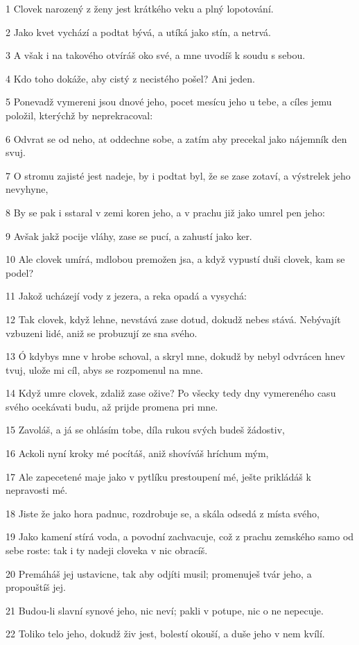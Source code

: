\par 1 Clovek narozený z ženy jest krátkého veku a plný lopotování.
\par 2 Jako kvet vychází a podtat bývá, a utíká jako stín, a netrvá.
\par 3 A však i na takového otvíráš oko své, a mne uvodíš k soudu s sebou.
\par 4 Kdo toho dokáže, aby cistý z necistého pošel? Ani jeden.
\par 5 Ponevadž vymereni jsou dnové jeho, pocet mesícu jeho u tebe, a cíles jemu položil, kterýchž by neprekracoval:
\par 6 Odvrat se od neho, at oddechne sobe, a zatím aby precekal jako nájemník den svuj.
\par 7 O stromu zajisté jest nadeje, by i podtat byl, že se zase zotaví, a výstrelek jeho nevyhyne,
\par 8 By se pak i sstaral v zemi koren jeho, a v prachu již jako umrel pen jeho:
\par 9 Avšak jakž pocije vláhy, zase se pucí, a zahustí jako ker.
\par 10 Ale clovek umírá, mdlobou premožen jsa, a když vypustí duši clovek, kam se podel?
\par 11 Jakož ucházejí vody z jezera, a reka opadá a vysychá:
\par 12 Tak clovek, když lehne, nevstává zase dotud, dokudž nebes stává. Nebývajít vzbuzeni lidé, aniž se probuzují ze sna svého.
\par 13 Ó kdybys mne v hrobe schoval, a skryl mne, dokudž by nebyl odvrácen hnev tvuj, ulože mi cíl, abys se rozpomenul na mne.
\par 14 Když umre clovek, zdaliž zase ožive? Po všecky tedy dny vymereného casu svého ocekávati budu, až prijde promena pri mne.
\par 15 Zavoláš, a já se ohlásím tobe, díla rukou svých budeš žádostiv,
\par 16 Ackoli nyní kroky mé pocítáš, aniž shovíváš hríchum mým,
\par 17 Ale zapecetené maje jako v pytlíku prestoupení mé, ješte prikládáš k nepravosti mé.
\par 18 Jiste že jako hora padnuc, rozdrobuje se, a skála odsedá z místa svého,
\par 19 Jako kamení stírá voda, a povodní zachvacuje, což z prachu zemského samo od sebe roste: tak i ty nadeji cloveka v nic obracíš.
\par 20 Premáháš jej ustavicne, tak aby odjíti musil; promenuješ tvár jeho, a propouštíš jej.
\par 21 Budou-li slavní synové jeho, nic neví; pakli v potupe, nic o ne nepecuje.
\par 22 Toliko telo jeho, dokudž živ jest, bolestí okouší, a duše jeho v nem kvílí.

